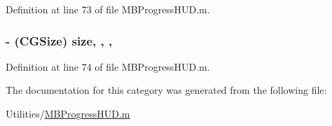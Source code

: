 Definition at line 73 of file M\+B\+Progress\+H\+U\+D.\+m.

\hypertarget{category_m_b_progress_h_u_d_07_08_aa7e6a57f64a0347bf480dc63ca6d2d35}{
\subsubsection[{size}]{\setlength{\rightskip}{0pt plus 5cm}-\/ (C\+G\+Size) size\hspace{0.3cm}{\ttfamily [read]}, {\ttfamily [write]}, {\ttfamily [atomic]}, {\ttfamily [assign]}}}\label{category_m_b_progress_h_u_d_07_08_aa7e6a57f64a0347bf480dc63ca6d2d35}


Definition at line 74 of file M\+B\+Progress\+H\+U\+D.\+m.



The documentation for this category was generated from the following file\+:\begin{DoxyCompactItemize}
\item 
Utilities/\hyperlink{_m_b_progress_h_u_d_8m}{M\+B\+Progress\+H\+U\+D.\+m}\end{DoxyCompactItemize}
